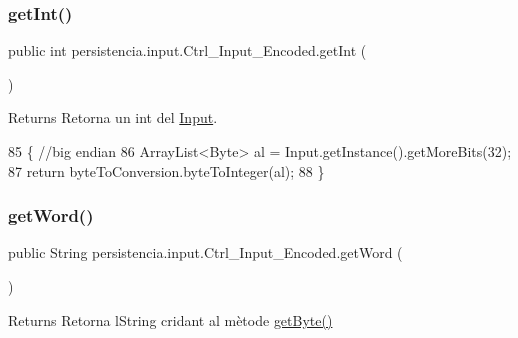 \subsubsection{\texorpdfstring{get\+Int()}{getInt()}}
{\footnotesize\ttfamily public int persistencia.\+input.\+Ctrl\+\_\+\+Input\+\_\+\+Encoded.\+get\+Int (\begin{DoxyParamCaption}{ }\end{DoxyParamCaption})\hspace{0.3cm}{\ttfamily [inline]}}

\begin{DoxyReturn}{Returns}
Retorna un int del \hyperlink{classpersistencia_1_1input_1_1Input}{Input}. 
\end{DoxyReturn}

\begin{DoxyCode}
85                         \{ \textcolor{comment}{//big endian}
86         ArrayList<Byte> al = Input.getInstance().getMoreBits(32);
87         \textcolor{keywordflow}{return} byteToConversion.byteToInteger(al);
88     \}
\end{DoxyCode}
\mbox{\label{classpersistencia_1_1input_1_1Ctrl__Input__Encoded_a87ebc4b52c5884ba9c397558668e67d7}} 
\subsubsection{\texorpdfstring{get\+Word()}{getWord()}}
{\footnotesize\ttfamily public String persistencia.\+input.\+Ctrl\+\_\+\+Input\+\_\+\+Encoded.\+get\+Word (\begin{DoxyParamCaption}{ }\end{DoxyParamCaption})\hspace{0.3cm}{\ttfamily [inline]}}

\begin{DoxyReturn}{Returns}
Retorna l\textquotesingle{}String cridant al mètode \hyperlink{classpersistencia_1_1input_1_1Ctrl__Input__Encoded_a38ede6bc49251e77ae4be30ccc06457d}{get\+Byte()} 
\end{DoxyReturn}

